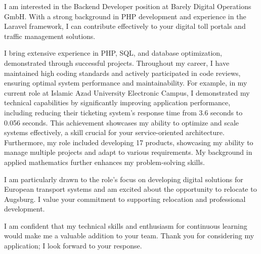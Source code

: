 \documentclass[10pt,stdletter,dateno]{newlfm}
\begin{document}
\begin{newlfm}
    I am interested in the Backend Developer position at Barely Digital Operations GmbH. With a strong background in PHP development and experience in the Laravel framework, I can contribute effectively to your digital toll portals and traffic management solutions.

    I bring extensive experience in PHP, SQL, and database optimization, demonstrated through successful projects. 
    Throughout my career, I have maintained high coding standards and actively participated in code reviews, 
    ensuring optimal system performance and maintainability. For example, in my current role at Islamic Azad University Electronic Campus, I demonstrated my technical capabilities by significantly improving application performance, including reducing their ticketing system's response time from 3.6 seconds to 0.056 seconds. This achievement showcases my ability to optimize and scale systems effectively, a skill crucial for your service-oriented architecture. Furthermore, my role included developing 17 products, showcasing my ability to manage multiple projects and adapt to various requirements. My background in applied mathematics further enhances my problem-solving skills.
   
   I am particularly drawn to the role's focus on developing digital solutions for European transport systems and am excited about the opportunity to relocate to Augsburg. I value your commitment to supporting relocation and professional development.
   
   I am confident that my technical skills and enthusiasm for continuous learning would make me a valuable addition to your team. Thank you for considering my application; I look forward to your response.

    

\end{newlfm}
\end{document}
